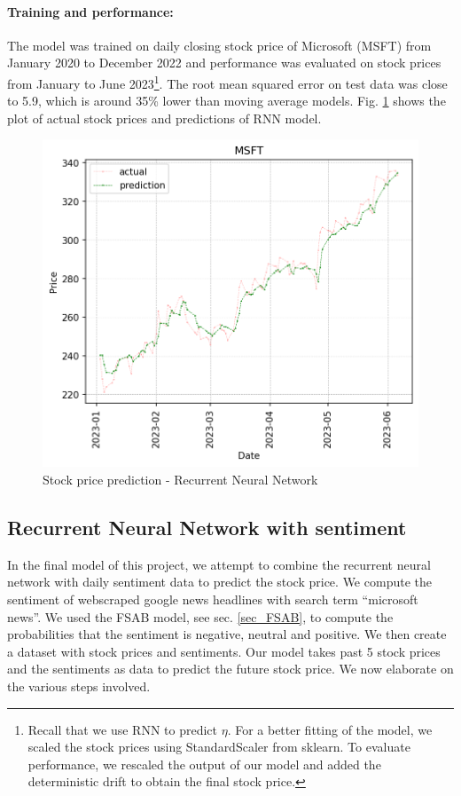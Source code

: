 \documentclass[11pt]{article}
\begin{document}
\paragraph{Training and performance:}{The model was trained on daily closing stock price of Microsoft (MSFT) from January 2020 to December 2022 and performance was evaluated on stock prices from January to June 2023\footnote{Recall that we use RNN to predict $\eta$. For a better fitting of the model, we scaled the stock prices using StandardScaler from sklearn. To evaluate performance, we rescaled the output of our model and added the deterministic drift to obtain the final stock price.}. The root mean squared error on test data was close to 5.9, which is  around 35\% lower than moving average models. Fig. \ref{fig_simplernn} shows the plot of actual stock prices and predictions of RNN model.}
\begin{figure}[h]
	\centering
	\includegraphics[width = 0.75\linewidth]{graphics/simplernn.png}
	\caption{Stock price prediction - Recurrent Neural Network}
	\label{fig_simplernn}
\end{figure}

\subsection{Recurrent Neural Network with sentiment}
In the final model of this project, we attempt to combine the recurrent neural network with daily sentiment data to predict the stock price. We compute the sentiment of webscraped google news headlines with search term ``microsoft news''. We used the FSAB model, see sec. \ref{sec_FSAB}, to compute the probabilities that the sentiment is negative, neutral and positive. We then create a dataset with stock prices and sentiments. Our model takes past 5 stock prices and the sentiments as data to predict the future stock price. We now elaborate on the various steps involved.
\end{document}
